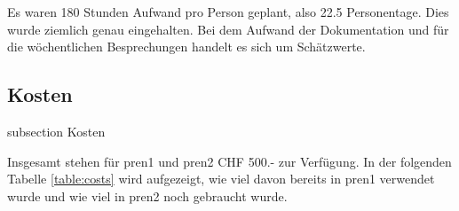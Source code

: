 Es waren 180 Stunden Aufwand pro Person geplant, also 22.5 Personentage. Dies wurde ziemlich genau eingehalten. Bei dem Aufwand der Dokumentation und für die wöchentlichen Besprechungen handelt es sich um Schätzwerte.

\newpage

\subsection*{Kosten}\label{kosten}
    {subsection}
    {Kosten}

Insgesamt stehen für \acrshort{pren1} und \acrshort{pren2} CHF 500.- zur Verfügung. In der folgenden Tabelle \ref{table:costs} wird aufgezeigt, wie viel davon bereits in \acrshort{pren1} verwendet wurde und wie viel in \acrshort{pren2} noch gebraucht wurde.


